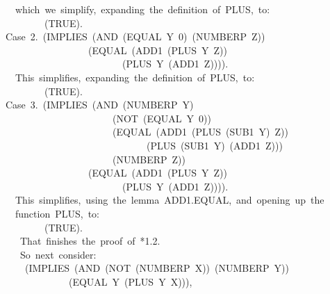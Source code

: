 \documentclass[10pt]{book}
\newenvironment{pubasis}{\begin{flushleft}}{\end{flushleft}}
\begin{document}
\begin{pubasis}
~~~~which~we~simplify,~expanding~the~definition~of~PLUS,~to:\\

~~~~~~~~~~(TRUE).\\

~~Case~2.~(IMPLIES~(AND~(EQUAL~Y~0)~(NUMBERP~Z))\\
~~~~~~~~~~~~~~~~~~~(EQUAL~(ADD1~(PLUS~Y~Z))\\
~~~~~~~~~~~~~~~~~~~~~~~~~~(PLUS~Y~(ADD1~Z)))).\\

~~~~This~simplifies,~expanding~the~definition~of~PLUS,~to:\\

~~~~~~~~~~(TRUE).\\

~~Case~3.~(IMPLIES~(AND~(NUMBERP~Y)\\
~~~~~~~~~~~~~~~~~~~~~~~~(NOT~(EQUAL~Y~0))\\
~~~~~~~~~~~~~~~~~~~~~~~~(EQUAL~(ADD1~(PLUS~(SUB1~Y)~Z))\\
~~~~~~~~~~~~~~~~~~~~~~~~~~~~~~~(PLUS~(SUB1~Y)~(ADD1~Z)))\\
~~~~~~~~~~~~~~~~~~~~~~~~(NUMBERP~Z))\\
~~~~~~~~~~~~~~~~~~~(EQUAL~(ADD1~(PLUS~Y~Z))\\
~~~~~~~~~~~~~~~~~~~~~~~~~~(PLUS~Y~(ADD1~Z)))).\\

~~~~This~simplifies,~using~the~lemma~ADD1.EQUAL,~and~opening~up~the\\
~~~~function~PLUS,~to:\\

~~~~~~~~~~(TRUE).\\

~~~~~That~finishes~the~proof~of~*1.2.\\

~~~~~So~next~consider:\\

~~~~~~(IMPLIES~(AND~(NOT~(NUMBERP~X))~(NUMBERP~Y))\\
~~~~~~~~~~~~~~~(EQUAL~Y~(PLUS~Y~X))),\\


\end{pubasis}
\end{document}
